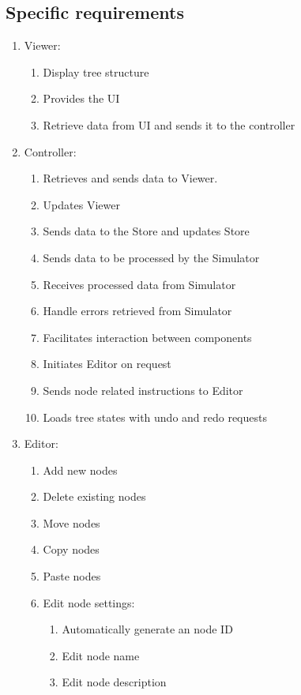 \documentclass{article}
\begin{document}
  \subsection{Specific requirements}
  \renewcommand{\labelenumii}{\Roman{enumii}}
  \begin{enumerate}
  \item Viewer:
    \begin{enumerate}
      \item Display tree structure
      \item Provides the UI
      \item Retrieve data from UI and sends it to the controller
    \end{enumerate}
    \item Controller:
    \begin{enumerate}
      \item Retrieves and sends data to Viewer.
      \item Updates Viewer
      \item Sends data to the Store and updates Store
      \item Sends data to be processed by the Simulator
      \item Receives processed data from Simulator
      \item Handle errors retrieved from Simulator
      \item Facilitates interaction between components
      \item Initiates Editor on request
      \item Sends node related instructions to Editor
      \item Loads tree states with undo and redo requests
    \end{enumerate}
    \item Editor:
    \begin{enumerate}
      \item Add new nodes
      \item Delete existing nodes
      \item Move nodes
      \item Copy nodes
      \item Paste nodes
      \item Edit node settings:
      \begin{enumerate}
        \item Automatically generate an node ID
        \item Edit node name
        \item Edit node description

\end{enumerate}
\end{enumerate}
\end{enumerate}
\end{document}
